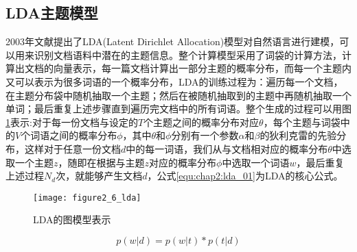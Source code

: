 \subsection{LDA主题模型}
2003年文献\cite{blei2003latent}提出了LDA(Latent Dirichlet Allocation)模型对自然语言进行建模，可以用来识别文档语料中潜在的主题信息。整个计算模型采用了词袋的计算方法，计算出文档的向量表示，每一篇文档计算出一部分主题的概率分布，而每一个主题内又可以表示为很多词语的一个概率分布，LDA的训练过程为：遍历每一个文档，在主题分布袋中随机抽取一个主题；然后在被随机抽取到的主题中再随机抽取一个单词；最后重复上述步骤直到遍历完文档中的所有词语。整个生成的过程可以用图\ref{fig:2_6}表示:对于每一份文档与设定的$T$个主题之间的概率分布对应$\theta $，每个主题与词袋中的$V$个词语之间的概率分布$\phi$，其中$\theta $和$\phi$分别有一个参数$\alpha$和$\beta$的狄利克雷的先验分布，这样对于任意一份文档$d$中的每一词语，我们从与文档相对应的概率分布$\theta $中选取一个主题$z$，随即在根据与主题$z$对应的概率分布$\phi$中选取一个词语$w$，最后重复上述过程$N_{d}$次，就能够产生文档$d$，公式\ref{equ:chap2:lda_01}为LDA的核心公式。
\begin{figure}[htp]
\centering
\texttt{[image: figure2\_6\_lda]}
\caption{LDA的图模型表示}
\label{fig:2_6}
\end{figure}
\begin{equation}
\label{equ:chap2:lda_01}
p(w|d)=p(w|t) \ast p(t|d)
\end{equation}
